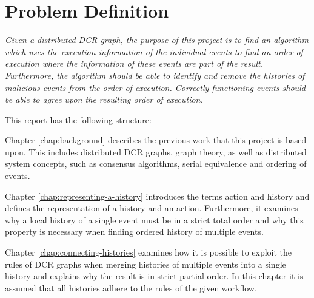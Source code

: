 \section{Problem Definition}
	\textit{Given a distributed DCR graph, the purpose of this project is to find an algorithm which uses the execution information of the individual events to find an order of execution where the information of these events are part of the result. Furthermore, the algorithm should be able to identify and remove the histories of malicious events from the order of execution. Correctly functioning events should be able to agree upon the resulting order of execution.}
	
	\vspace{0.4cm}
	
	\newpar
	This report has the following structure:
	
	\newpar
	Chapter \ref{chap:background} describes the previous work that this project is based upon. This includes distributed DCR graphs, graph theory, as well as distributed system concepts, such as consensus algorithms, serial equivalence and ordering of events.
		
	\newpar
	Chapter \ref{chap:representing-a-history} introduces the terms action and history and defines the representation of a history and an action.
	Furthermore, it examines why a local history of a single event must be in a strict total order and why this property is necessary when finding ordered history of multiple events. 
		
	\newpar
	Chapter \ref{chap:connecting-histories} examines how it is possible to exploit the rules of DCR graphs when merging histories of multiple events into a single history and explains why the result is in strict partial order. In this chapter it is assumed that all histories adhere to the rules of the given workflow.
	
